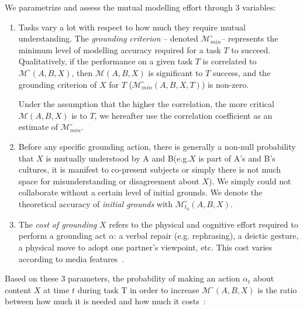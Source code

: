 \documentclass[natbib]{svjour3}
\newcommand{\eg}{e.g.\xspace}
\newcommand{\A}{A\xspace}
\newcommand{\B}{B\xspace}
\newcommand{\model}[3]{{$\mathcal{M}(#1, #2, #3)$}}
\newcommand{\Model}[3]{{$\mathcal{M}^{\circ}(#1, #2, #3)$}}
\newcommand{\groundingcriterion}{{$\mathcal{M}^{\circ}_{min}$}}
\begin{document}
We parametrize and assess the mutual modelling effort through 3 variables:

\begin{enumerate}

    \item Tasks vary a lot with respect to how much they require mutual
        understanding.  The \emph{grounding criterion} -- denoted
        \groundingcriterion -- represents the minimum level of modelling
        accuracy required for a task $T$ to succeed. Qualitatively, if the
        performance on a given task $T$ is correlated to \Model{A}{B}{X}, then
        \model{A}{B}{X} is significant to $T$ success, and the
        grounding criterion of $X$ for $T$
        ($\mathcal{M}^{\circ}_{min}(A,B,X,T)$) is non-zero.

        Under the assumption that the higher the correlation, the more
        critical \model{A}{B}{X} is to $T$, we hereafter use the correlation
        coefficient as an estimate of \groundingcriterion.
        \vspace{1em}

    \item Before any specific grounding action, there is generally a non-null
        probability that $X$ is mutually understood by \A and \B (\eg $X$ is
        part of \A's and \B's cultures, it is manifest to co-present subjects
        or simply there is not much space for misunderstanding or disagreement
        about $X$). We simply could not collaborate without a certain level of
        initial grounds. We denote the theoretical accuracy of \emph{initial
        grounds} with $\mathcal{M}^{\circ}_{t_0}(A,B,X)$.
        \vspace{1em}

    \item The \emph{cost of grounding} $X$ refers to the physical and cognitive
        effort required to perform a grounding act $\alpha$: a verbal repair
        (\eg rephrasing), a deictic gesture, a physical move to adopt one
        partner's viewpoint, etc. This cost varies according to media
        features~\citep{clark1991grounding}.

\end{enumerate}

Based on these 3 parameters, the probability of making an action $\alpha_{t}$
about content $X$ at time $t$ during task T in order to increase \Model{A}{B}{X}
is the ratio between how much it is needed and how much it
costs~\citep{traum1996miscommunication}:
\end{document}
